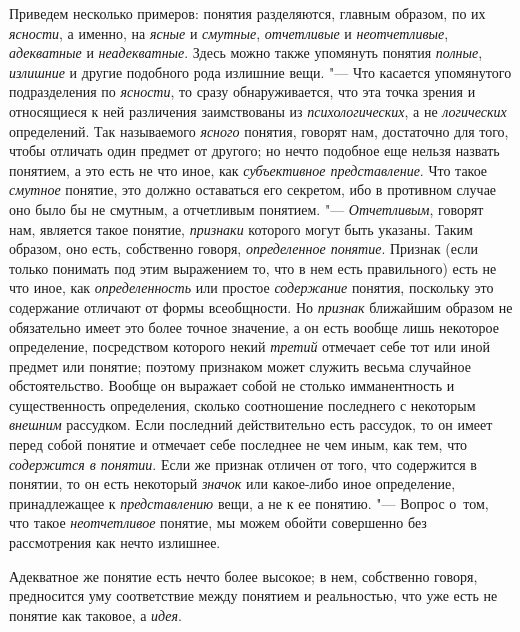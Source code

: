 Приведем несколько примеров: понятия разделяются, главным образом, по их
{\em ясности}, а именно, на {\em ясные} и {\em смутные}, {\em отчетливые} и
{\em неотчетливые}, {\em адекватные} и {\em неадекватные}. Здесь можно также
упомянуть понятия {\em полные}, {\em излишние} и другие подобного рода излишние
вещи. "--- Что касается упомянутого подразделения по {\em ясности}, то сразу
обнаруживается, что эта точка зрения и относящиеся к ней различения
заимствованы из {\em психологических}, а не {\em логических} определений. Так
называемого {\em ясного} понятия, говорят нам, достаточно для того, чтобы
отличать один предмет от другого; но нечто подобное еще нельзя назвать
понятием, а это есть не что иное, как {\em субъективное представление}. Что
такое {\em смутное} понятие, это должно оставаться его секретом, ибо в
противном случае оно было бы не смутным, а отчетливым понятием. "---
{\em Отчетливым}, говорят нам, является такое понятие, {\em признаки} которого
могут быть указаны. Таким образом, оно есть, собственно говоря,
{\em определенное понятие}. Признак (если только понимать под этим выражением
то, что в нем есть правильного) есть не что иное, как {\em определенность} или
простое {\em содержание} понятия, поскольку это содержание отличают от формы
всеобщности. Но {\em признак} ближайшим образом не обязательно имеет это более
точное значение, а он есть вообще лишь некоторое определение, посредством
которого некий {\em третий} отмечает себе тот или иной предмет или понятие;
поэтому признаком может служить весьма случайное обстоятельство. Вообще он
выражает собой не столько имманентность и существенность определения, сколько
соотношение последнего с некоторым {\em внешним} рассудком. Если последний
действительно есть рассудок, то он имеет перед собой понятие и отмечает себе
последнее не чем иным, как тем, что {\em содержится в понятии}. Если же
признак отличен от того, что содержится в понятии, то он
есть некоторый {\em значок} или какое-либо иное определение,
принадлежащее к {\em представлению} вещи, а не к ее понятию. "--- Вопрос
о~том, что такое {\em неотчетливое} понятие, мы можем обойти совершенно
без рассмотрения как нечто излишнее.

Адекватное же понятие есть нечто более высокое; в нем,
собственно говоря, предносится уму соответствие между понятием и
реальностью, что уже есть не понятие как таковое, а {\em идея}.

